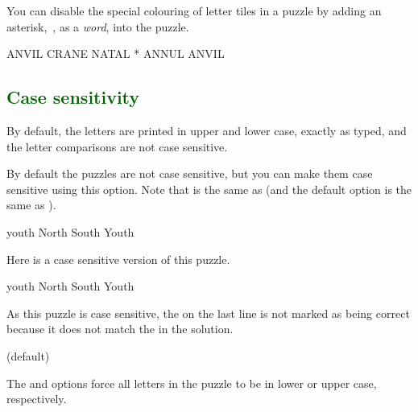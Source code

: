 \documentclass[svgnames]{report}
\newcommand\Section[1]{\subsection{\textcolor{DarkGreen}{#1}}}
\begin{document}
  You can disable the special colouring of letter tiles in a
   puzzle by adding an asterisk,~\option{*}, as a
  \textit{word}, into the puzzle.

  \begin{example}
  \begin{wordle}{ANVIL}
    CRANE
    NATAL
    *      %
    ANNUL
    ANVIL
  \end{wordle}
  \end{example}


  \Section{Case sensitivity}

  By default, the letters are printed in upper and lower case, exactly
  as typed, and the letter comparisons are not case sensitive.


  By default the  puzzles are not case sensitive, but
  you can make them case sensitive using this option. Note that
   is the same as 
  (and the default option is the same as
  ).

  \begin{example}
  \begin{wordle}[case sensitive=false]{youth} %
    North
    South
    Youth
  \end{wordle}
  \end{example}

  Here is a case sensitive version of this puzzle.

  \begin{example}
  \begin{wordle}{youth}
    North
    South
    Youth
  \end{wordle}
  \end{example}

  As this puzzle is case sensitive, the  on the last line is
  not marked as being correct because it does not match the 
  in the solution.

   (default) \qquad
   \qquad

  The  and  options force all
  letters in the puzzle to be in lower or upper case, respectively.
\end{document}
